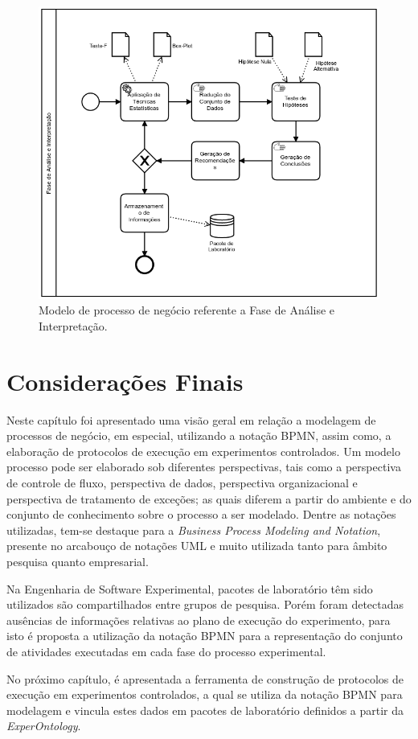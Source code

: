 \begin{figure}[!ht]
\centering
\includegraphics[width=\textwidth]{images/modelo-analise.png}
\caption{Modelo de processo de negócio referente a Fase de Análise e Interpretação.}
\label{img:modelo-analise}
\end{figure}

\section{Considerações Finais}
Neste capítulo foi apresentado uma visão geral em relação a modelagem de processos de negócio, em especial, utilizando a notação BPMN, assim como, a elaboração de protocolos de execução em experimentos controlados. Um modelo processo pode ser elaborado sob diferentes perspectivas, tais como a perspectiva de controle de fluxo, perspectiva de dados, perspectiva organizacional e perspectiva de tratamento de exceções; as quais diferem a partir do ambiente e do conjunto de conhecimento sobre o processo a ser modelado. Dentre as notações utilizadas, tem-se destaque para a \textit{Business Process Modeling and Notation}, presente no arcabouço de notações UML e muito utilizada tanto para âmbito pesquisa quanto empresarial.

Na Engenharia de Software Experimental, pacotes de laboratório têm sido utilizados são compartilhados entre grupos de pesquisa. Porém foram detectadas ausências de informações relativas ao plano de execução do experimento, para isto é proposta a utilização da notação BPMN para a representação do conjunto de atividades executadas em cada fase do processo experimental.

No próximo capítulo, é apresentada a ferramenta de construção de protocolos de execução em experimentos controlados, a qual se utiliza da notação BPMN para modelagem e vincula estes dados em pacotes de laboratório definidos a partir da \textit{ExperOntology}.






